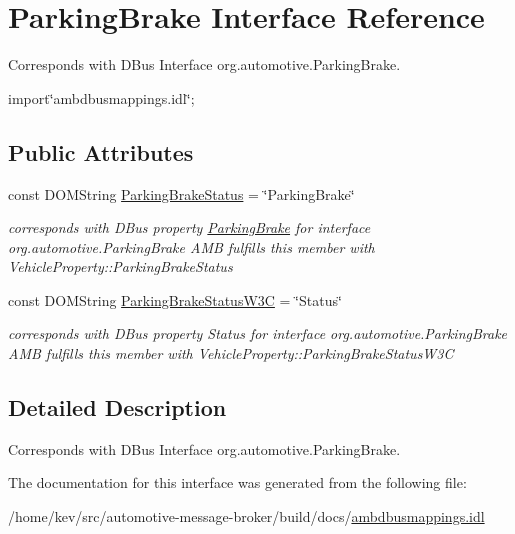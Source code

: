\hypertarget{interfaceParkingBrake}{\section{Parking\+Brake Interface Reference}
\label{interfaceParkingBrake}
}


Corresponds with D\+Bus Interface org.\+automotive.\+Parking\+Brake.  




{\ttfamily import\char`\"{}ambdbusmappings.\+idl\char`\"{};}

\subsection*{Public Attributes}
\begin{DoxyCompactItemize}
\item 
\hypertarget{interfaceParkingBrake_ad3955889a251a4cf6920501d2cc8adea}{const D\+O\+M\+String \hyperlink{interfaceParkingBrake_ad3955889a251a4cf6920501d2cc8adea}{Parking\+Brake\+Status} = \char`\"{}Parking\+Brake\char`\"{}}\label{interfaceParkingBrake_ad3955889a251a4cf6920501d2cc8adea}

\begin{DoxyCompactList}\small\item\em corresponds with D\+Bus property \hyperlink{interfaceParkingBrake}{Parking\+Brake} for interface org.\+automotive.\+Parking\+Brake A\+M\+B fulfills this member with Vehicle\+Property\+::\+Parking\+Brake\+Status \end{DoxyCompactList}\item 
\hypertarget{interfaceParkingBrake_a549f6509cf0b23bfaae43928fd103da7}{const D\+O\+M\+String \hyperlink{interfaceParkingBrake_a549f6509cf0b23bfaae43928fd103da7}{Parking\+Brake\+Status\+W3\+C} = \char`\"{}Status\char`\"{}}\label{interfaceParkingBrake_a549f6509cf0b23bfaae43928fd103da7}

\begin{DoxyCompactList}\small\item\em corresponds with D\+Bus property Status for interface org.\+automotive.\+Parking\+Brake A\+M\+B fulfills this member with Vehicle\+Property\+::\+Parking\+Brake\+Status\+W3\+C \end{DoxyCompactList}\end{DoxyCompactItemize}


\subsection{Detailed Description}
Corresponds with D\+Bus Interface org.\+automotive.\+Parking\+Brake. 

The documentation for this interface was generated from the following file\+:\begin{DoxyCompactItemize}
\item 
/home/kev/src/automotive-\/message-\/broker/build/docs/\hyperlink{ambdbusmappings_8idl}{ambdbusmappings.\+idl}\end{DoxyCompactItemize}
